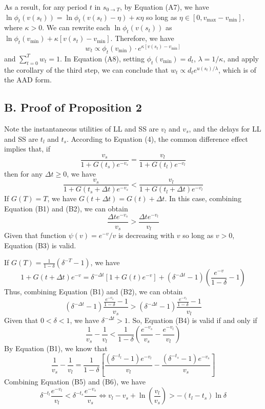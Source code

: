 As a result, for any period \(t\) in \(s_{0\rightarrow T}\), by Equation
(A7), we have \(\ln \phi_t(v(s_t))=\ln\phi_t(v(s_t)-\eta)+\kappa\eta\)
so long as \(\eta\in[0,v_{\max}-v_{\min}]\), where \(\kappa>0\). We can
rewrite each \(\ln \phi_t(v(s_t))\) as
\(\ln \phi_t(v_{\min})+\kappa[v(s_t)-v_{\min}]\). Therefore, we
have\[\tag{A8}
w_t \propto \phi_t(v_{\min})\cdot e^{\kappa[v(s_t)-v_{\min}]}
\]and \(\sum_{t=0}^T w_t=1\). In Equation (A8), setting
\(\phi_t(v_{\min})=d_t\), \(\lambda = 1/\kappa\), and apply the
corollary of the third step, we can conclude that
\(w_t\propto d_t e^{u(s_t)/\lambda}\), which is of the AAD form.

\hypertarget{b.-proof-of-proposition-2}{%
\subsection*{B. Proof of Proposition
2}\label{b.-proof-of-proposition-2}}

Note the instantaneous utilities of LL and SS are \(v_l\) and \(v_s\),
and the delays for LL and SS are \(t_l\) and \(t_s\). According to
Equation (4), the common difference effect implies that, if\[ \tag{B1}
\frac{v_s}{1+G(t_s)e^{-v_s}} = \frac{v_l}{1+G(t_l)e^{-v_l}}
\]then for any \(\Delta t \geq 0\), we have \[ \tag{B2}
\frac{v_s}{1+G(t_s+\Delta t)e^{-v_s}} < \frac{v_l}{1+G(t_l+\Delta t)e^{-v_l}}
\]If \(G(T)=T\), we have \(G(t+\Delta t) = G(t) + \Delta t\). In this
case, combining Equation (B1) and (B2), we can obtain\[ \tag{B3}
\frac{\Delta t e^{-v_s}}{v_s} > \frac{\Delta t e^{-v_l}}{v_l}
\]Given that function \(\psi(v) = e^{-v}/v\) is decreasing with \(v\) so
long as \(v>0\), Equation (B3) is valid.

If \(G(T) = \frac{1}{1-\delta}(\delta^{-T}-1)\), we have\[
1+G(t+\Delta t)e^{-v} = \delta^{-\Delta t}[1+G(t)e^{-v}]+(\delta^{-\Delta t}-1)(\frac{e^{-v}}{1-\delta}-1)
\] Thus, combining Equation (B1) and (B2), we can obtain\[\tag{B4}
(\delta^{-\Delta t}-1)\frac{\frac{e^{-v_s}}{1-\delta}-1}{v_s} >
(\delta^{-\Delta t}-1)\frac{\frac{e^{-v_l}}{1-\delta}-1}{v_l}
\] Given that \(0<\delta<1\), we have \(\delta^{-\Delta t}>1\). So,
Equation (B4) is valid if and only if\[\tag{B5}
\frac{1}{v_s}-\frac{1}{v_l}<\frac{1}{1-\delta}(\frac{e^{-v_s}}{v_s}-\frac{e^{-v_l}}{v_l})
\] By Equation (B1), we know that\[\tag{B6}
\frac{1}{v_s}-\frac{1}{v_l}=\frac{1}{1-\delta}\left[\frac{(\delta^{-t_l}-1)e^{-v_l}}{v_l} -\frac{(\delta^{-t_s}-1)e^{-v_s}}{v_s}\right]
\] Combining Equation (B5) and (B6), we have\[
\delta^{-t_l}\frac{e^{-v_l}}{v_l}<\delta^{-t_s}\frac{e^{-v_s}}{v_s} \Longleftrightarrow v_l - v_s + \ln \left(\frac{v_l}{v_s}\right)>-(t_l-t_s)\ln\delta
\]

